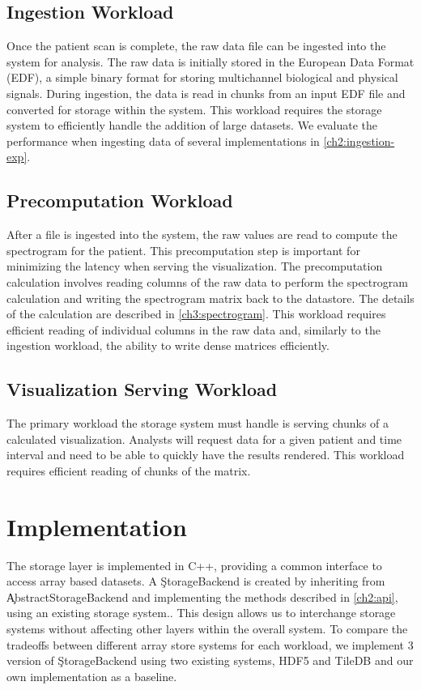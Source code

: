 \subsection{Ingestion Workload}

Once the patient scan is complete, the raw data file can be ingested into the
system for analysis. The raw data is initially stored in the European Data
Format (EDF)\cite{edf}, a simple binary format for storing multichannel
biological and physical signals. During ingestion, the data is read in chunks
from an input EDF file and converted for storage within the system. This
workload requires the storage system to efficiently handle the addition of
large datasets. We evaluate the performance when ingesting data of several
implementations in \ref{ch2:ingestion-exp}.


\subsection{Precomputation Workload}

After a file is ingested into the system, the raw values are read to compute
the spectrogram for the patient. This precomputation step is important for
minimizing the latency when serving the visualization. The precomputation
calculation involves reading columns of the raw data to perform the spectrogram
calculation and writing the spectrogram matrix back to the datastore. The
details of the calculation are described in \ref{ch3:spectrogram}. This
workload requires efficient reading of individual columns in the raw data and,
similarly to the ingestion workload, the ability to write dense matrices
efficiently.

\subsection{Visualization Serving Workload}

The primary workload the storage system must handle is serving chunks of a
calculated visualization. Analysts will request data for a given patient and
time interval and need to be able to quickly have the results rendered. This
workload requires efficient reading of chunks of the matrix.

\section{Implementation}

The storage layer is implemented in C++, providing a common interface to access
array based datasets. A \c{StorageBackend} is created by inheriting from
\c{AbstractStorageBackend} and implementing the methods described in
\ref{ch2:api}, using an existing storage system.. This design allows us to
interchange storage systems without affecting other layers within the overall
system. To compare the tradeoffs between different array store systems for each
workload, we implement 3 version of \c{StorageBackend} using two existing
systems, HDF5 \cite{hdf5} and TileDB \cite{tiledb} and our own implementation
as a baseline.

